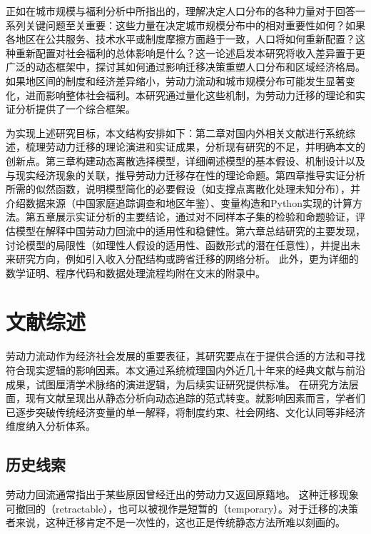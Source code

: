 \documentclass[a4paper,12pt,oneside, fontset=mac]{ctexbook} %
\begin{document}
正如\cite{desmetUrbanAccountingWelfare2013}在城市规模与福利分析中所指出的，理解决定人口分布的各种力量对于回答一系列关键问题至关重要：这些力量在决定城市规模分布中的相对重要性如何？如果各地区在公共服务、技术水平或制度摩擦方面趋于一致，人口将如何重新配置？这种重新配置对社会福利的总体影响是什么？这一论述启发本研究将收入差异置于更广泛的动态框架中，探讨其如何通过影响迁移决策重塑人口分布和区域经济格局。如果地区间的制度和经济差异缩小，劳动力流动和城市规模分布可能发生显著变化，进而影响整体社会福利。本研究通过量化这些机制，为劳动力迁移的理论和实证分析提供了一个综合框架。

为实现上述研究目标，本文结构安排如下：第二章对国内外相关文献进行系统综述，梳理劳动力迁移的理论演进和实证成果，分析现有研究的不足，并明确本文的创新点。第三章构建动态离散选择模型，详细阐述模型的基本假设、机制设计以及与现实经济现象的关联，推导劳动力迁移存在性的理论命题。第四章推导实证分析所需的似然函数，说明模型简化的必要假设（如支撑点离散化处理未知分布），并介绍数据来源（中国家庭追踪调查和地区年鉴）、变量构造和Python实现的计算方法。第五章展示实证分析的主要结论，通过对不同样本子集的检验和命题验证，评估模型在解释中国劳动力回流中的适用性和稳健性。第六章总结研究的主要发现，讨论模型的局限性（如理性人假设的适用性、函数形式的潜在任意性），并提出未来研究方向，例如引入收入分配结构或跨省迁移的网络分析。
此外，更为详细的数学证明、程序代码和数据处理流程均附在文末的附录中。



\chapter{文献综述}

劳动力流动作为经济社会发展的重要表征，其研究要点在于提供合适的方法和寻找符合现实逻辑的影响因素。本文通过系统梳理国内外近几十年来的经典文献与前沿成果，试图厘清学术脉络的演进逻辑，为后续实证研究提供标准。
在研究方法层面，现有文献呈现出从静态分析向动态追踪的范式转变。就影响因素而言，学者们已逐步突破传统经济变量的单一解释，将制度约束、社会网络、文化认同等非经济维度纳入分析体系。

\section{历史线索}
\label{sec:_历史线索}


劳动力回流通常指出于某些原因曾经迁出的劳动力又返回原籍地。
这种迁移现象可撤回的（retractable），也可以被视作是短暂的（temporary）。对于迁移的决策者来说，这种迁移肯定不是一次性的，这也正是传统静态方法所难以刻画的。
\end{document}
